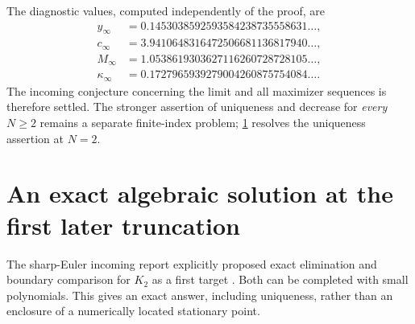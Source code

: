 \documentclass[11pt]{article}
\numberwithin{equation}{section}
\theoremstyle{definition}
\theoremstyle{remark}
\begin{document}
The diagnostic values, computed independently of the proof, are
\begin{align*}
 y_\infty&=0.1453038592593584238735558631\ldots,\\
 c_\infty&=3.9410648316472506681136817940\ldots,\\
 M_\infty&=1.0538619303627116260728728105\ldots,\\
 \kappa_\infty&=0.1727965939279004260875754084\ldots.
\end{align*}
The incoming conjecture concerning the limit and all maximizer sequences
is therefore settled. The stronger assertion of uniqueness and decrease
for \emph{every} $N\ge2$ remains a separate finite-index problem;
\cref{sec:exact-M2} resolves the uniqueness assertion at $N=2$.


\section{An exact algebraic solution at the first later truncation}
\label{sec:exact-M2}

The sharp-Euler incoming report explicitly proposed exact elimination
and boundary comparison for $K_2$ as a first target
\cite[Section 8]{SharpEulerIncoming}. Both can be completed with small
polynomials. This gives an exact answer, including uniqueness, rather
than an enclosure of a numerically located stationary point.
\end{document}
